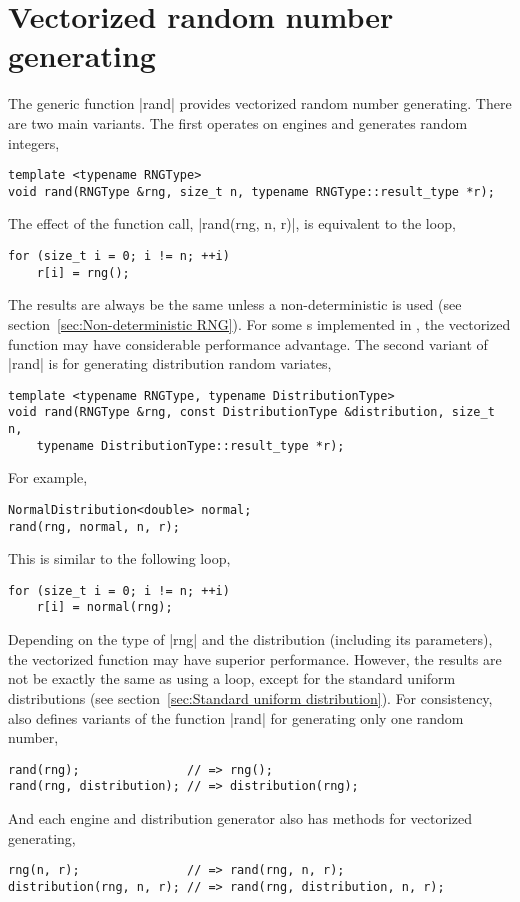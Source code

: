 \section{Vectorized random number generating}
\label{sec:Vectorized random number generating}

The generic function |rand| provides vectorized random number generating. There
are two main variants. The first operates on \rng engines and generates random
integers,
\begin{verbatim}
template <typename RNGType>
void rand(RNGType &rng, size_t n, typename RNGType::result_type *r);
\end{verbatim}
The effect of the function call, |rand(rng, n, r)|, is equivalent to the loop,
\begin{verbatim}
for (size_t i = 0; i != n; ++i)
    r[i] = rng();
\end{verbatim}
The results are always be the same unless a non-deterministic \rng is used (see
section~\ref{sec:Non-deterministic RNG}). For some \rng{}s implemented in
\mckl, the vectorized function may have considerable performance advantage. The
second variant of |rand| is for generating distribution random variates,
\begin{verbatim}
template <typename RNGType, typename DistributionType>
void rand(RNGType &rng, const DistributionType &distribution, size_t n,
    typename DistributionType::result_type *r);
\end{verbatim}
For example,
\begin{verbatim}
NormalDistribution<double> normal;
rand(rng, normal, n, r);
\end{verbatim}
This is similar to the following loop,
\begin{verbatim}
for (size_t i = 0; i != n; ++i)
    r[i] = normal(rng);
\end{verbatim}
Depending on the type of |rng| and the distribution (including its parameters),
the vectorized function may have superior performance. However, the results are
not be exactly the same as using a loop, except for the standard uniform
distributions (see section~\ref{sec:Standard uniform distribution}). For
consistency, \mckl also defines variants of the function |rand| for generating
only one random number,
\begin{verbatim}
rand(rng);               // => rng();
rand(rng, distribution); // => distribution(rng);
\end{verbatim}
And each \rng engine and distribution generator also has methods for vectorized
generating,
\begin{verbatim}
rng(n, r);               // => rand(rng, n, r);
distribution(rng, n, r); // => rand(rng, distribution, n, r);
\end{verbatim}

